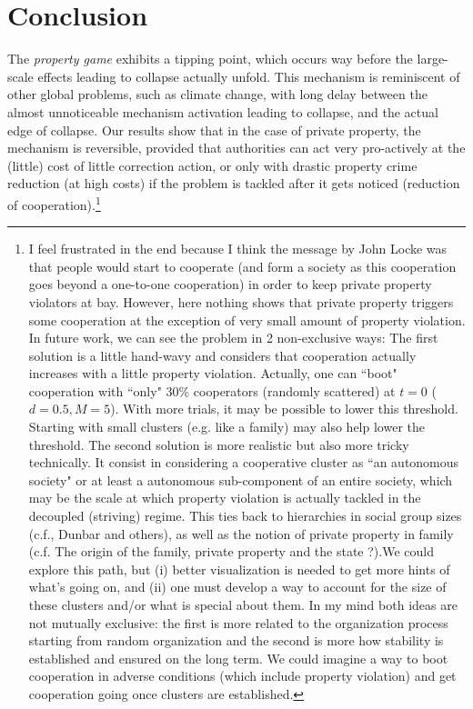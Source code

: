 \section*{Conclusion}
The {\it property game} exhibits a tipping point, which occurs way before the large-scale effects leading to collapse actually unfold. This mechanism is reminiscent of other global problems, such as climate change, with long delay between the almost unnoticeable mechanism activation leading to collapse, and the actual edge of collapse. Our results show that in the case of private property, the mechanism is reversible, provided that authorities can act very pro-actively at the (little) cost of little correction action, or only with drastic property crime reduction (at high costs) if the problem is tackled after it gets noticed (reduction of cooperation).\footnote{I feel frustrated in the end because I think the message by John Locke was that people would start to cooperate (and form a society as this cooperation goes beyond a one-to-one cooperation) in order to keep private property violators at bay. However, here nothing shows that private property triggers some cooperation at the exception of very small amount of property violation. In future work, we can see the problem in 2 non-exclusive ways: The first solution is a little hand-wavy and considers that cooperation actually increases with a little property violation. Actually, one can ``boot" cooperation with ``only" 30\% cooperators (randomly scattered) at $t=0$ ($d=0.5,M=5$). With more trials, it may be possible to lower this threshold. Starting with small clusters (e.g. like a family) may also help lower the threshold. The second solution is more realistic but also more tricky technically. It consist in considering a cooperative cluster as ``an autonomous society" or at least a autonomous sub-component of an entire society, which may be the scale at which property violation is actually tackled in the decoupled (striving) regime. This ties back to hierarchies in social group sizes  (c.f., Dunbar and others), as well as the notion of private property in family (c.f. The origin of the family, private property and the state \cite{engels1978origin}?).We could explore this path, but (i) better visualization is needed to get more hints of what's going on, and (ii) one must develop a way to account for the size of these clusters and/or what is special about them. In my mind both ideas are not mutually exclusive: the first is more related to the organization process starting from random organization and the second is more how stability is established and ensured on the long term. We could imagine a way to boot cooperation in adverse conditions (which include property violation) and get cooperation going once clusters are established.}